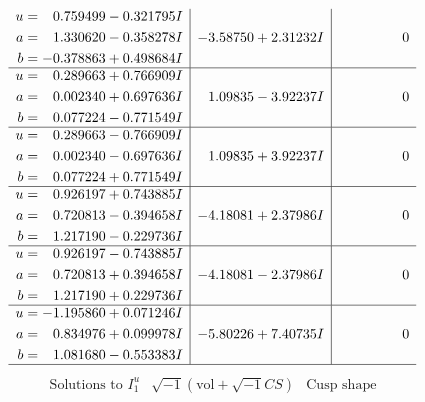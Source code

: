 \documentclass[1p]{elsarticle_modified}
\theoremstyle{definition}
\newcommand{\I}{\sqrt{-1}}
\begin{document}
$$\begin{array}{c|c|c}
\begin{aligned}
u &= \phantom{-}0.759499 - 0.321795 I \\
a &= \phantom{-}1.330620 - 0.358278 I \\
b &= -0.378863 + 0.498684 I\end{aligned}
 & -3.58750 + 2.31232 I & \phantom{-0.000000 } 0 \\ \hline\begin{aligned}
u &= \phantom{-}0.289663 + 0.766909 I \\
a &= \phantom{-}0.002340 + 0.697636 I \\
b &= \phantom{-}0.077224 - 0.771549 I\end{aligned}
 & \phantom{-}1.09835 - 3.92237 I & \phantom{-0.000000 } 0 \\ \hline\begin{aligned}
u &= \phantom{-}0.289663 - 0.766909 I \\
a &= \phantom{-}0.002340 - 0.697636 I \\
b &= \phantom{-}0.077224 + 0.771549 I\end{aligned}
 & \phantom{-}1.09835 + 3.92237 I & \phantom{-0.000000 } 0 \\ \hline\begin{aligned}
u &= \phantom{-}0.926197 + 0.743885 I \\
a &= \phantom{-}0.720813 - 0.394658 I \\
b &= \phantom{-}1.217190 - 0.229736 I\end{aligned}
 & -4.18081 + 2.37986 I & \phantom{-0.000000 } 0 \\ \hline\begin{aligned}
u &= \phantom{-}0.926197 - 0.743885 I \\
a &= \phantom{-}0.720813 + 0.394658 I \\
b &= \phantom{-}1.217190 + 0.229736 I\end{aligned}
 & -4.18081 - 2.37986 I & \phantom{-0.000000 } 0 \\ \hline\begin{aligned}
u &= -1.195860 + 0.071246 I \\
a &= \phantom{-}0.834976 + 0.099978 I \\
b &= \phantom{-}1.081680 - 0.553383 I\end{aligned}
 & -5.80226 + 7.40735 I & \phantom{-0.000000 } 0\\
 \hline 
 \end{array}$$\newpage$$\begin{array}{c|c|c}  
\text{Solutions to }I^u_{1}& \I (\text{vol} + \sqrt{-1}CS) & \text{Cusp shape}\\

\end{array}$$
\end{document}

